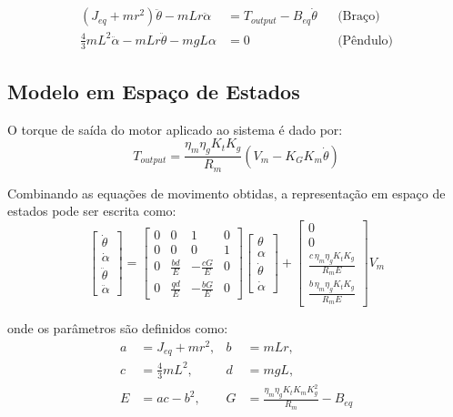 \documentclass[9pt,a4paper,twocolumn,twoside]{tau-class/tau}
\begin{document}
\begin{align}
    (J_{eq} + m r^2)\ddot{\theta} - m L r \ddot{\alpha} &= T_{output} - B_{eq}\dot{\theta} 
    && \text{(Braço)} \\
    \tfrac{4}{3} m L^2 \ddot{\alpha} - m L r \ddot{\theta} - m g L \alpha &= 0
    && \text{(Pêndulo)}
\end{align}



\subsection{Modelo em Espaço de Estados}

O torque de saída do motor aplicado ao sistema é dado por:
\begin{equation}
    T_{output} = \frac{\eta_m \eta_g K_t K_g}{R_m} \left( V_m - K_G K_m \dot{\theta} \right) 
    \label{eq:torque}
\end{equation}

Combinando as equações de movimento obtidas, a representação em espaço de estados pode ser escrita como:
\begin{equation}
\begin{bmatrix}
\dot{\theta} \\
\dot{\alpha} \\
\ddot{\theta} \\
\ddot{\alpha}
\end{bmatrix}
=
\begin{bmatrix}
0 & 0 & 1 & 0 \\
0 & 0 & 0 & 1 \\
0 & \tfrac{bd}{E} & -\tfrac{cG}{E} & 0 \\
0 & \tfrac{qd}{E} & -\tfrac{bG}{E} & 0
\end{bmatrix}
\begin{bmatrix}
\theta \\ \alpha \\ \dot{\theta} \\ \dot{\alpha}
\end{bmatrix}
+
\begin{bmatrix}
0 \\
0 \\
\tfrac{c \, \eta_m \eta_g K_t K_g}{R_m E} \\
\tfrac{b \, \eta_m \eta_g K_t K_g}{R_m E}
\end{bmatrix} V_m
\label{eq:estado}
\end{equation}

onde os parâmetros são definidos como:
\begin{align*}
a &= J_{eq} + mr^2, & b &= mLr, \\
c &= \tfrac{4}{3} mL^2, & d &= mgL, \\
E &= ac - b^2, & G &= \tfrac{\eta_m \eta_g K_t K_m K_g^2}{R_m} - B_{eq}
\end{align*}
\end{document}
